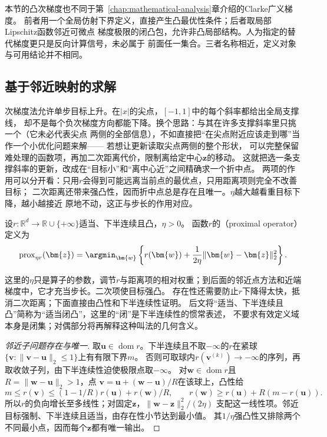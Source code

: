 本节的凸次梯度也不同于第~\ref{chap:mathematical-analysis}章介绍的Clarke广义梯度。
前者用一个全局仿射下界定义，直接产生凸最优性条件；后者取局部Lipschitz函数邻近可微点
梯度极限的闭凸包，允许非凸局部结构。人为指定的替代梯度更只是反向计算信号，未必属于
前面任一集合。三者名称相近，定义对象与可用结论并不相同。

\subsection{基于邻近映射的求解}
\label{sec:opt-nonsmooth-proximal}
\label{sec:opt-weaker-curvature}

次梯度法允许单步目标上升。在$|x|$的尖点，$[-1,1]$中的每个斜率都给出全局支撑线，
却不是每个负次梯度方向都能下降。换个思路：与其在许多支撑斜率里只挑一个（它未必代表尖点
两侧的全部信息），不如直接把“在尖点附近应该走到哪”当作一个小优化问题来解——
若想让更新读取尖点两侧的整个形状，
可以完整保留难处理的函数项，再加二次距离代价，限制离给定中心$\bm z$的移动。
这就把选一条支撑斜率的更新，改成在“目标小”和“离中心近”之间精确求一个折中点。
两项的作用可以分开看：只用$r$会得到可能远离当前点的最优点，只用距离项则完全不改善目标；
二次距离还带来强凸性，因而折中点总是存在且唯一。$\eta$越大越看重目标下降，越小越接近
原地不动，这正与步长的作用对应。
\begin{definition}[凸函数的邻近算子]
\label{def:opt-proximal-operator}
设$r:\mathbb R^d\to\mathbb R\cup\{+\infty\}$适当、下半连续且凸，$\eta>0$。
函数$r$的（proximal operator）定义为
\[
  \operatorname{prox}_{\eta r}(\bm{z})
  =\argmin_{\bm{w}}
  \left\{r(\bm{w})+\frac{1}{2\eta}
  \lVert\bm{w}-\bm{z}\rVert_2^2\right\}.
\]
\end{definition}
这里的$\eta$只是算子的参数，调节$r$与距离项的相对权重；到后面的邻近点方法和近端梯度中，它才充当步长。二次项使目标强凸。
存在性还需要防止$r$下降得太快，抵消二次距离；下面直接由凸性和下半连续性证明。
后文将“适当、下半连续且凸”简称为“适当闭凸”，这里的“闭”是下半连续性的惯常表述，
不要求有效定义域本身是闭集；对偶部分将再解释这种叫法的几何含义。

\begin{proof}[邻近子问题存在与唯一]
取$\bm u\in\operatorname{dom}r$。下半连续且不取$-\infty$的$r$在紧球
$\{\bm v:\|\bm v-\bm u\|_2\leq1\}$上有有限下界$m$。
否则可取球内$r(\bm v^{(k)})\to-\infty$的序列，再取收敛子列，由下半连续性迫使极限点取$-\infty$。
对$\bm w\in\operatorname{dom}r$且$R=\|\bm w-\bm u\|_2>1$，点
$\bm v=\bm u+(\bm w-\bm u)/R$在该球上，凸性给
\[
 m\leq r(\bm v)\leq(1-1/R)r(\bm u)+r(\bm w)/R,
 \qquad
 r(\bm w)\geq r(\bm u)+R(m-r(\bm u)).
\]
所以$r$的负向增长至多线性；对固定$\bm z$，$\|\bm w-\bm z\|_2^2/(2\eta)$
支配这一线性项。邻近目标强制、下半连续且适当，由存在性小节达到最小值。
其$1/\eta$强凸性又排除两个不同最小点，因而每个$\bm z$都有唯一输出。
\end{proof}

